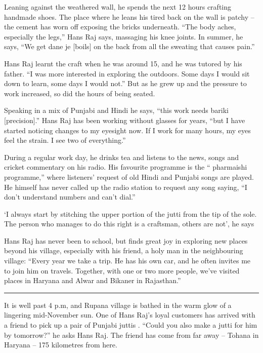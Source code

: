 \documentclass[
]{interact}
\begin{document}
Leaning against the weathered wall, he spends the next 12 hours crafting
handmade shoes. The place where he leans his tired back on the wall is
patchy -- the cement has worn off exposing the bricks underneath. ``The
body aches, especially the legs,'' Hans Raj says, massaging his knee
joints. In summer, he says, ``We get dane je {[}boils{]} on the back
from all the sweating that causes pain.''

Hans Raj learnt the craft when he was around 15, and he was tutored by
his father. ``I was more interested in exploring the outdoors. Some days
I would sit down to learn, some days I would not.'' But as he grew up
and the pressure to work increased, so did the hours of being seated.

Speaking in a mix of Punjabi and Hindi he says, ``this work needs bariki
{[}precision{]}.'' Hans Raj has been working without glasses for years,
``but I have started noticing changes to my eyesight now. If I work for
many hours, my eyes feel the strain. I see two of everything.''

During a regular work day, he drinks tea and listens to the news, songs
and cricket commentary on his radio. His favourite programme is the ``
pharmaishi programme,'' where listeners' request of old Hindi and
Punjabi songs are played. He himself has never called up the radio
station to request any song saying, ``I don't understand numbers and
can't dial.''

`I always start by stitching the upper portion of the jutti from the tip
of the sole. The person who manages to do this right is a craftsman,
others are not', he says

Hans Raj has never been to school, but finds great joy in exploring new
places beyond his village, especially with his friend, a holy man in the
neighbouring village: ``Every year we take a trip. He has his own car,
and he often invites me to join him on travels. Together, with one or
two more people, we've visited places in Haryana and Alwar and Bikaner
in Rajasthan.''

\begin{center}\rule{0.5\linewidth}{0.5pt}\end{center}

It is well past 4 p.m, and Rupana village is bathed in the warm glow of
a lingering mid-November sun. One of Hans Raj's loyal customers has
arrived with a friend to pick up a pair of Punjabi juttis . ``Could you
also make a jutti for him by tomorrow?'' he asks Hans Raj. The friend
has come from far away -- Tohana in Haryana -- 175 kilometres from here.
\end{document}
